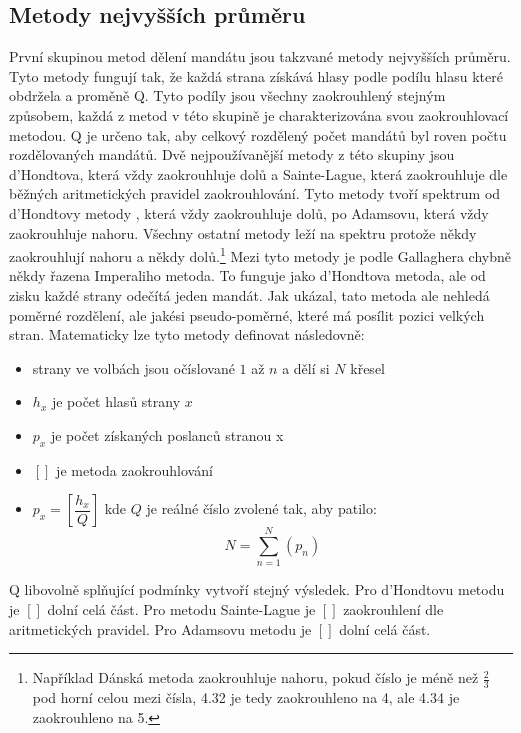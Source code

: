 \documentclass[12pt]{report}
\begin{document}
\subsection{Metody nejvyšších průměru} První skupinou metod dělení mandátu jsou takzvané metody nejvyšších průměru.
Tyto metody fungují tak, že každá strana získává hlasy podle podílu hlasu které obdržela a proměně Q.
Tyto podíly jsou všechny zaokrouhlený stejným způsobem, každá z metod v této skupině je charakterizována svou zaokrouhlovací metodou.
Q je určeno tak, aby celkový rozdělený počet mandátů byl roven počtu rozdělovaných mandátů.
Dvě nejpoužívanější metody z této skupiny jsou d'Hondtova, která vždy zaokrouhluje dolů a Sainte-Lague, která zaokrouhluje dle běžných aritmetických pravidel zaokrouhlování.
Tyto metody tvoří spektrum od d'Hondtovy metody , která vždy zaokrouhluje dolů, po Adamsovu, která vždy zaokrouhluje nahoru.
Všechny ostatní metody leží na spektru protože někdy zaokrouhlují nahoru a někdy dolů.\footnote{Například Dánská metoda zaokrouhluje nahoru, pokud číslo je méně než $\frac{2}{3}$ pod horní celou mezi čísla, 4.32 je tedy zaokrouhleno na 4, ale 4.34 je zaokrouhleno na 5.} Mezi tyto metody je podle Gallaghera chybně někdy řazena Imperaliho metoda.
To funguje jako d'Hondtova metoda, ale od zisku každé strany odečítá jeden mandát.
Jak ukázal, tato metoda ale nehledá poměrné rozdělení, ale jakési pseudo-poměrné, které má posílit pozici velkých stran.
\autocite{GAL1} \newpage Matematicky lze tyto metody definovat následovně: \begin{itemize} \item strany ve volbách jsou očíslované $1$ až $n$ a dělí si $N$ křesel \item $h_{x}$ je počet hlasů strany $x$ \item $p_{x}$ je počet získaných poslanců stranou x \item $[ ]$ je metoda zaokrouhlování \item $p_{x}=[\dfrac{h_{x}}{Q}]$ kde $Q$ je reálné číslo zvolené tak, aby patilo: $$N=\sum_{n=1}^{N} (p_{n})$$ \end{itemize} Q libovolně splňující podmínky vytvoří stejný výsledek.\autocite{GAL1} Pro d'Hondtovu metodu je $[ ]$ dolní celá část.
Pro metodu Sainte-Lague je $[ ]$ zaokrouhlení dle aritmetických pravidel.
Pro Adamsovu metodu je $[ ]$ dolní celá část.
\end{document}

